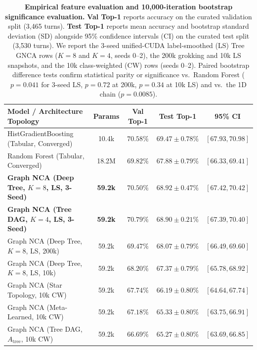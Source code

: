 \documentclass[10pt,twocolumn,letterpaper]{article}
\begin{document}
\begin{table}[tbp]
\centering
\small
\setlength{\tabcolsep}{4pt}
\caption{\textbf{Empirical feature evaluation and 10{,}000-iteration bootstrap significance evaluation.} \textbf{Val Top-1} reports accuracy on the curated validation split (3{,}465 turns). \textbf{Test Top-1} reports mean accuracy and bootstrap standard deviation (SD) alongside 95\% confidence intervals (CI) on the curated test split (3{,}530 turns). We report the 3-seed unified-CUDA label-smoothed (LS) Tree GNCA rows ($K{=}8$ and $K{=}4$, seeds 0--2), the 200k grokking and 10k LS snapshots, and the 10k class-weighted (CW) rows (seeds 0--2). Paired bootstrap difference tests confirm statistical parity or significance vs.\ Random Forest ($p = 0.041$ for 3-seed LS, $p = 0.72$ at 200k, $p = 0.34$ at 10k LS) and vs.\ the 1D chain ($p = 0.0085$).}
\label{tab:feature-eval}
\vspace{8pt}
\begin{tabular*}{\textwidth}{@{\extracolsep{\fill}}lcccc@{}}
\toprule
\textbf{Model / Architecture Topology} & \textbf{Params} & \textbf{Val Top-1} & \textbf{Test Top-1} & \textbf{95\% CI} \\
\midrule
HistGradientBoosting (Tabular, Converged) & 10.4k & $70.58\%$ & $69.47 \pm 0.78\%$ & $[67.93, 70.98]$ \\
Random Forest (Tabular, Converged) & 18.2M & $69.82\%$ & $67.88 \pm 0.79\%$ & $[66.33, 69.41]$ \\
\midrule
\textbf{Graph NCA (Deep Tree, $K{=}8$, LS, 3-Seed)} & \textbf{59.2k} & $\mathbf{70.50\%}$ & $\mathbf{68.92 \pm 0.47\%}$ & $\mathbf{[67.42, 70.42]}$ \\
\textbf{Graph NCA (Tree DAG, $K{=}4$, LS, 3-Seed)} & \textbf{59.2k} & $\mathbf{70.79\%}$ & $\mathbf{68.90 \pm 0.21\%}$ & $\mathbf{[67.39, 70.40]}$ \\
Graph NCA (Deep Tree, $K{=}8$, LS, 200k) & 59.2k & $69.47\%$ & $68.07 \pm 0.79\%$ & $[66.49, 69.60]$ \\
Graph NCA (Deep Tree, $K{=}8$, LS, 10k) & 59.2k & $68.20\%$ & $67.37 \pm 0.79\%$ & $[65.78, 68.92]$ \\
Graph NCA (Star Topology, 10k CW) & 59.2k & $67.74\%$ & $66.19 \pm 0.80\%$ & $[64.64, 67.74]$ \\
Graph NCA (Meta-Learned, 10k CW) & 59.2k & $67.18\%$ & $65.33 \pm 0.80\%$ & $[63.75, 66.91]$ \\
Graph NCA (Tree DAG, $A_{\text{tree}}$, 10k CW) & 59.2k & $66.69\%$ & $65.27 \pm 0.80\%$ & $[63.69, 66.85]$ \\

\end{tabular*}
\end{table}
\end{document}
